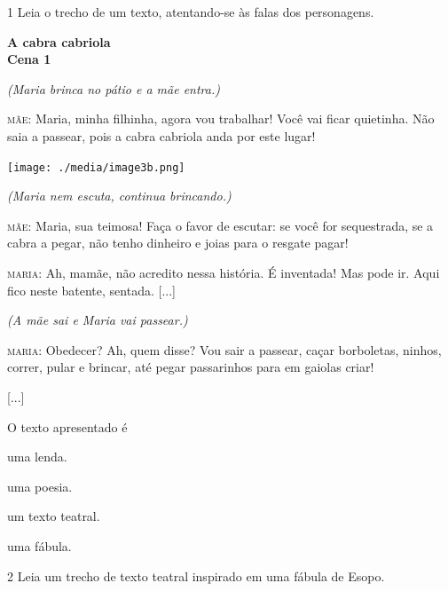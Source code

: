 \num{1} Leia o trecho de um texto, atentando-se às falas dos personagens.

\begin{myquote}
\textbf{A cabra cabriola}\\
\textbf{Cena 1}

\textit{(Maria brinca no pátio e a mãe entra.)}

\textsc{mãe}: Maria, minha filhinha, agora vou trabalhar! Você vai ficar
quietinha. Não saia a passear, pois a cabra cabriola anda por este
lugar!

\begin{center}
\noindent\texttt{[image: ./media/image3b.png]}
\end{center}

\textit{(Maria nem escuta, continua brincando.)}

\textsc{mãe}: Maria, sua teimosa! Faça o favor de escutar: se você for
sequestrada, se a cabra a pegar, não tenho dinheiro e joias para o
resgate pagar!

\textsc{maria}: Ah, mamãe, não acredito nessa história. É inventada! Mas
pode ir. Aqui fico neste batente, sentada. {[}...{]}

\textit{(A mãe sai e Maria vai passear.)}

\textsc{maria}: Obedecer? Ah, quem disse? Vou sair a passear, caçar
borboletas, ninhos, correr, pular e brincar, até pegar passarinhos para
em gaiolas criar!

{[}...{]}

\end{myquote}

O texto apresentado é

\begin{escolha}[itemsep=-5pt]
\item uma lenda.

\item uma poesia.

\item um texto teatral.

\item uma fábula.
\end{escolha}


\num{2} Leia um trecho de texto teatral inspirado em uma fábula de Esopo.

